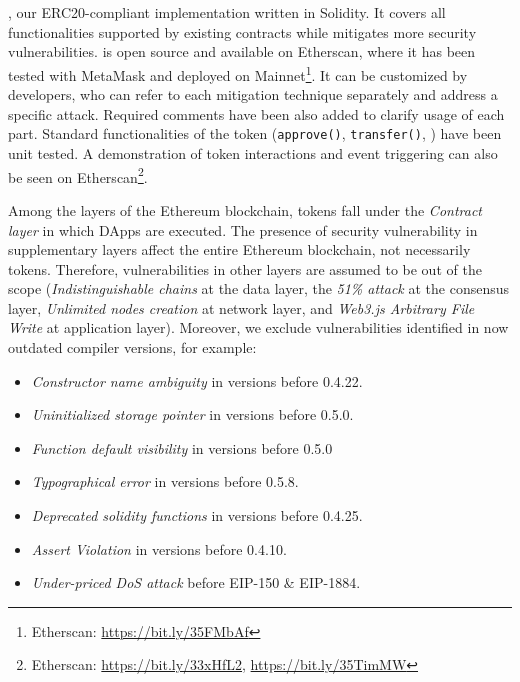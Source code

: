

\section{\sys}\label{sec:proposal}
\sys, our ERC20-compliant implementation written in Solidity. {\blue It covers all functionalities supported by existing \erc contracts while mitigates more security vulnerabilities.} \sys is open source and available on Etherscan, where it has been tested with MetaMask and deployed on Mainnet\footnote{Etherscan: \url{https://bit.ly/35FMbAf}}. It can be customized by developers, who can refer to each mitigation technique separately and address a specific attack. Required comments have been also added to clarify usage of each part. Standard functionalities of the token (\ie \texttt{approve()}, \texttt{transfer()}, \etc) have been unit tested. A demonstration of token interactions and event triggering can also be seen on Etherscan\footnote{Etherscan: \url{https://bit.ly/33xHfL2}, \url{https://bit.ly/35TimMW}}.

Among the layers of the Ethereum blockchain, \erc tokens fall under the \textit{Contract layer} in which DApps are executed. The presence of security vulnerability in supplementary layers affect the entire Ethereum blockchain, not necessarily \erc tokens. Therefore, vulnerabilities in other layers are assumed to be out of the scope (\eg \textit{Indistinguishable chains} at the data layer, the \textit{51\% attack} at the consensus layer, \textit{Unlimited nodes creation} at network layer, and \textit{Web3.js Arbitrary File Write} at application layer). Moreover, we exclude vulnerabilities identified in now outdated compiler versions, for example:
\begin{itemize}[noitemsep,topsep=0pt]
	\item \textit{Constructor name ambiguity} in versions before 0.4.22.
	\item \textit{Uninitialized storage pointer} in versions before 0.5.0.
	\item \textit{Function default visibility} in versions before 0.5.0
	\item \textit{Typographical error} in versions before 0.5.8.
	\item \textit{Deprecated solidity functions} in versions before 0.4.25.
	\item \textit{Assert Violation} in versions before 0.4.10.
	\item \textit{Under-priced DoS attack} before EIP-150 \& EIP-1884.
\end{itemize}

